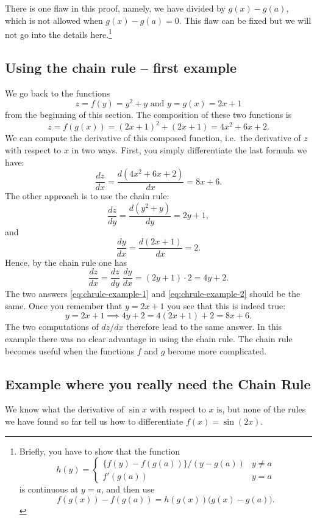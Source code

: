 There is one flaw in this proof, namely, we have divided by $g(x)-g(a)$, which
is not allowed when $g(x)-g(a) = 0$.  This flaw can be fixed but we will not go
into the details here.\footnote{ Briefly, you have to show that the function
  \[ h(y) =
  \begin{cases} \{f(y)-f(g(a))\}/(y-g(a)) & y\neq a \\ f'(g(a)) & y=a
  \end{cases}
  \] is continuous at $y=a$, and then use
  \[
  f(g(x)) - f(g(a)) = h(g(x)) \bigl(g(x) - g(a)\bigr).
  \]
}


\subsection{Using the chain rule -- first example}
We go back to the functions 
\[
z=f(y) = y^{2}+y \text{ and } y = g(x) = 2x+1
\]
from the beginning of this section. The composition of these two
functions is
\[
z=f(g(x)) = (2x+1)^{2}+(2x+1) = 4x^{2}+6x+2.
\]
We can compute the derivative of this composed function, i.e.\ the
derivative of $z$ with respect to $x$ in two ways.  First, you simply
differentiate the last formula we have:
\begin{equation}\label{eq:chrule-example-1}
  \frac{dz}{dx} = \frac{d(4x^{2}+6x+2)}{dx} = 8x+6.
\end{equation}
The other approach is to use the chain rule:
\[
\frac{dz}{dy} = \frac{d(y^2+y)}{dy} = 2y+1,
\]
and 
\[
\frac{dy}{dx} = \frac{d(2x+1)}{dx} = 2.
\]
Hence, by the chain rule one has
\begin{equation}\label{eq:chrule-example-2}
  \frac{dz}{dx} = \frac{dz}{dy} \; \frac{dy}{dx} = (2y+1)\cdot 2 = 4y+2.
\end{equation}
The two answers \eqref{eq:chrule-example-1} and
\eqref{eq:chrule-example-2} should be the same.  Once you remember
that $y=2x+1$ you see that this is indeed true:
\[
y=2x+1 \implies 4y+2 = 4(2x+1) + 2= 8x+6.
\]
The two computations of $dz/dx$ therefore lead to the same answer.  In
this example there was no clear advantage in using the chain rule.
The chain rule becomes useful when the functions $f$ and $g$ become
more complicated.


\subsection{Example where you really need the Chain Rule}
We know what the derivative of $\sin x$ with respect to $x$ is, but
none of the rules we have found so far tell us how to differentiate
$f(x) = \sin(2x)$.

